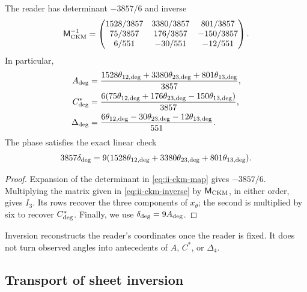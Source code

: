 \begin{proposition}
The reader has determinant \(-3857/6\) and inverse
\begin{equation}
 \mathsf M_{\rm CKM}^{-1}=
 \begin{pmatrix}
 1528/3857&3380/3857&801/3857\\
 75/3857&176/3857&-150/3857\\
 6/551&-30/551&-12/551
 \end{pmatrix}.
 \label{eq:ii-ckm-inverse}
\end{equation}
In particular,
\begin{align}
 A_{\rm deg}
 &=\frac{1528\theta_{12,\rm deg}+3380\theta_{23,\rm deg}
          +801\theta_{13,\rm deg}}{3857},\nonumber\\
 C^*_{\rm deg}
 &=\frac{6(75\theta_{12,\rm deg}+176\theta_{23,\rm deg}
          -150\theta_{13,\rm deg})}{3857},\nonumber\\
 \Delta_{\rm deg}
 &=\frac{6\theta_{12,\rm deg}-30\theta_{23,\rm deg}
          -12\theta_{13,\rm deg}}{551}.
 \label{eq:ii-ckm-recover}
\end{align}
The phase satisfies the exact linear check
\begin{equation}
 3857\delta_{\rm deg}
 =9(1528\theta_{12,\rm deg}+3380\theta_{23,\rm deg}
      +801\theta_{13,\rm deg}).
 \label{eq:ii-ckm-phase-check}
\end{equation}
\end{proposition}

\begin{proof}
Expansion of the determinant in \eqref{eq:ii-ckm-map} gives
\(-3857/6\). Multiplying the matrix given in
\eqref{eq:ii-ckm-inverse} by \(\mathsf M_{\rm CKM}\), in either
order, gives \(I_3\). Its rows recover the three components of
\(x_\theta\); the second is multiplied by six to recover
\(C^*_{\rm deg}\). Finally, we use
\(\delta_{\rm deg}=9A_{\rm deg}\).
\end{proof}

Inversion reconstructs the reader's coordinates once the reader is fixed. It does not
turn observed angles into antecedents of \(A\), \(C^*\), or
\(\Delta_4\).



\subsection{Transport of sheet inversion}

